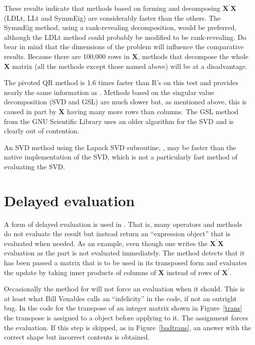 \documentclass[shortnames,article]{jss}
\begin{document}
These results indicate that methods based on forming and decomposing
$\bm X^\prime\bm X$ (LDLt, LLt and SymmEig) are considerably
faster than the others.  The SymmEig method, using a rank-revealing
decomposition, would be preferred, although the LDLt method could
probably be modified to be rank-revealing.  Do bear in mind that the
dimensions of the problem will influence the comparative results.
Because there are 100,000 rows in $\bm X$, methods that decompose the
whole $\bm X$ matrix (all the methods except those named above) will
be at a disadvantage.

The pivoted QR method is 1.6 times faster than R's  on
this test and provides nearly the same information as .
Methods based on the singular value decomposition (SVD and GSL) are
much slower but, as mentioned above, this is caused in part by $\bm X$
having many more rows than columns.  The GSL method from the GNU
Scientific Library uses an older algorithm for the SVD and is clearly
out of contention.

An SVD method using the Lapack SVD subroutine, , may be
faster than the native  implementation of the SVD, which is
not a particularly fast method of evaluating the SVD.

\section{Delayed evaluation}
\label{sec:delayed}

A form of delayed evaluation is used in .  That is, many
operators and methods do not evaluate the result but instead return an
``expression object'' that is evaluated when needed.  As an example,
even though one writes the $\bm X^\prime\bm X$ evaluation as
 the  part is not
evaluated immediately.  The  method detects that it
has been passed a matrix that is to be used in its transposed form and
evaluates the update by taking inner products of columns of $\bm X$
instead of rows of $\bm X^\prime$.

Occasionally the method for  will not force an
evaluation when it should.  This is at least what Bill Venables calls
an ``infelicity'' in the code, if not an outright bug.  In the code
for the transpose of an integer matrix shown in Figure~\ref{trans} the
transpose is assigned to a  object before applying
 to it.  The assignment forces the evaluation.  If this
step is skipped, as in Figure~\ref{badtrans}, an answer with the correct
shape but incorrect contents is obtained.
\end{document}
